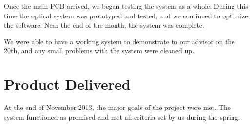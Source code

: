 Once the main PCB arrived, we began testing the system as a whole.
During this time the optical system was prototyped and tested, and we
continued to optimize the software. Near the end of the month, the system was
complete.

We were able to have a working system to demonstrate to our advisor on the 20th,
and any small problems with the system were cleaned up.

\section{Product Delivered}

At the end of November 2013, the major goals of the project were met. The system
functioned as promised and met all criteria set by us during the spring.

